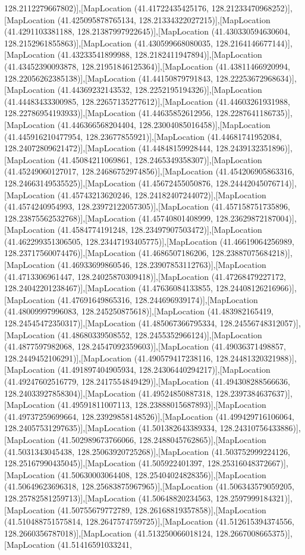 128.2112279667802)],[MapLocation (41.41722435425176, 128.21233470968252)],[MapLocation (41.425095878765134, 128.21334322027215)],[MapLocation (41.4291103381188, 128.21387997922645)],[MapLocation (41.430330594630604, 128.2152961855863)],[MapLocation (41.430599668080035, 128.2164146677144)],[MapLocation (41.43233541899988, 128.2182411947894)],[MapLocation (41.43452390093878, 128.21951846125364)],[MapLocation (41.43811466920994, 128.22056262385138)],[MapLocation (41.44150879791843, 128.22253672968634)],[MapLocation (41.44369232143532, 128.2252195194326)],[MapLocation (41.44483433300985, 128.22657135277612)],[MapLocation (41.44603261931988, 128.22786954193933)],[MapLocation (41.44635852612956, 128.2287641186735)],[MapLocation (41.446366568204404, 128.23004085016458)],[MapLocation (41.445916210477954, 128.23677855921)],[MapLocation (41.44681741952084, 128.24072809621472)],[MapLocation (41.44848159928444, 128.2439132351896)],[MapLocation (41.45084211069861, 128.2465349358307)],[MapLocation (41.45249060127017, 128.24686752974856)],[MapLocation (41.454206905863316, 128.24663149535525)],[MapLocation (41.45672455050876, 128.24442045076714)],[MapLocation (41.45743213620246, 128.24182407244072)],[MapLocation (41.4574240954993, 128.23972122057305)],[MapLocation (41.457158751735896, 128.23875562532768)],[MapLocation (41.45740801408999, 128.23629872187004)],[MapLocation (41.4584774191248, 128.23497907503472)],[MapLocation (41.462299351306505, 128.23447193405775)],[MapLocation (41.46619064256989, 128.23717560074476)],[MapLocation (41.4686507186206, 128.23887075684218)],[MapLocation (41.46933699860546, 128.23907853112763)],[MapLocation (41.4713306961447, 128.24025870309418)],[MapLocation (41.47268479227172, 128.24042201238467)],[MapLocation (41.47636084133855, 128.24408126216966)],[MapLocation (41.47691649865316, 128.244696939174)],[MapLocation (41.48009997996083, 128.245250875618)],[MapLocation (41.483982165419, 128.24545472350317)],[MapLocation (41.485067366795334, 128.24556748312057)],[MapLocation (41.48680339508552, 128.2455352966124)],[MapLocation (41.4877597982068, 128.24547092359603)],[MapLocation (41.49036371498857, 128.2449452106291)],[MapLocation (41.490579417238116, 128.24481320321988)],[MapLocation (41.491897404905934, 128.24306440294217)],[MapLocation (41.49247602516779, 128.2417554849429)],[MapLocation (41.494308288566636, 128.24033927858304)],[MapLocation (41.49524850887318, 128.2397384637637)],[MapLocation (41.49591811007113, 128.23888015687893)],[MapLocation (41.49737259699664, 128.23929858148526)],[MapLocation (41.499429716106064, 128.24057531297635)],[MapLocation (41.501382643389334, 128.24310756433886)],[MapLocation (41.502989673766066, 128.2488045762865)],[MapLocation (41.5031343045438, 128.25063920725268)],[MapLocation (41.503752999224126, 128.25167990435045)],[MapLocation (41.505922401397, 128.25316048372667)],[MapLocation (41.50630003064408, 128.25404024828356)],[MapLocation (41.50649623696318, 128.25683875967965)],[MapLocation (41.506343579059205, 128.25782581259713)],[MapLocation (41.50648820234563, 128.2597999184321)],[MapLocation (41.50755679772789, 128.26168819357858)],[MapLocation (41.510488751575814, 128.2647574759725)],[MapLocation (41.512615394374556, 128.2660356787018)],[MapLocation (41.513250066018124, 128.2667008665375)],[MapLocation (41.51416591033241, 